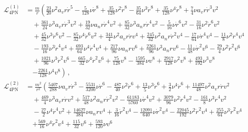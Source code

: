 \documentclass[prd,preprint,superscriptaddress,tightenlines,nofootinbib,
  eqsecnum,showpacs]{revtex4}
\begin{document}
\begin{subequations}
\begin{align}
\mathcal{L}^{(1)}_\text{4PN} &= \frac{m}{r} 
\left(\frac{23}{20} \nu^2 a_{v} r \dot{r}^5
 -  \frac{5}{128} \nu \dot{r}^8
 + \frac{35}{128} \nu^2 \dot{r}^8
 -  \frac{35}{64} \nu^3 \dot{r}^8
 + \frac{35}{128} \nu^4 \dot{r}^8
 + \frac{7}{4} \nu a_{v} r \dot{r}^3 v^{2}\right.\nonumber\\
& \quad + \frac{361}{24} \nu^3 a_{v} r \dot{r}^3 v^{2}
 + \frac{19}{32} \nu a_{n} r \dot{r}^4 v^{2}
 + \frac{85}{32} \nu^3 a_{n} r \dot{r}^4 v^{2}
 -  \frac{5}{16} \nu \dot{r}^6 v^{2}
 -  \frac{31}{16} \nu^2 \dot{r}^6 v^{2}\nonumber\\
&\quad + \frac{45}{32} \nu^3 \dot{r}^6 v^{2}
 -  \frac{85}{32} \nu^4 \dot{r}^6 v^{2}
 + \frac{341}{4} \nu^2 a_{v} r \dot{r} v^{4}
 + \frac{245}{32} \nu^2 a_{n} r \dot{r}^2 v^{4}
 -  \frac{17}{64} \nu \dot{r}^4 v^{4}
 -  \frac{11}{8} \nu^2 \dot{r}^4 v^{4}\nonumber\\
&\quad -  \frac{193}{16} \nu^3 \dot{r}^4 v^{4}
 + \frac{693}{64} \nu^4 \dot{r}^4 v^{4}
 + \frac{217}{96} \nu a_{n} r v^{6}
 + \frac{2261}{96} \nu^3 a_{n} r v^{6}
 -  \frac{11}{48} \nu \dot{r}^2 v^{6}
 -  \frac{29}{4} \nu^2 \dot{r}^2 v^{6}\nonumber\\
&\quad + \frac{1021}{96} \nu^3 \dot{r}^2 v^{6}
 -  \frac{665}{32} \nu^4 \dot{r}^2 v^{6}
 + \frac{75}{128} v^{8}
 -  \frac{1595}{384} \nu v^{8}
 + \frac{2917}{128} \nu^2 v^{8}
 + \frac{493}{192} \nu^3 v^{8}\nonumber\\
&\quad\left. -  \frac{2261}{128} \nu^4 v^{8}\right) \,,\\
\mathcal{L}^{(2)}_\text{4PN} &= \frac{m^2}{r^2} 
\left(\frac{5407}{288} \nu a_{v} r \dot{r}^3
 -  \frac{5531}{3200} \nu \dot{r}^6
 -  \frac{487}{40} \nu^2 \dot{r}^6
 + \frac{13}{5} \nu^3 \dot{r}^6
 + \frac{3}{2} \nu^4 \dot{r}^6
 + \frac{11497}{48} \nu^2 a_{v} r \dot{r} v^{2}\right.\nonumber\\
&\quad + \frac{469}{4} \nu^3 a_{v} r \dot{r} v^{2}
 + \frac{517}{48} \nu^2 a_{n} r \dot{r}^2 v^{2}
 -  \frac{61183}{5760} \nu \dot{r}^4 v^{2}
 + \frac{3079}{96} \nu^2 \dot{r}^4 v^{2}
 -  \frac{161}{8} \nu^3 \dot{r}^4 v^{2}\nonumber\\
&\quad -  \frac{27}{2} \nu^4 \dot{r}^4 v^{2}
 + \frac{14627}{384} \nu a_{n} r v^{4}
 + \frac{3}{16} \dot{r}^2 v^{4}
 -  \frac{12091}{640} \nu \dot{r}^2 v^{4}
 -  \frac{22045}{192} \nu^2 \dot{r}^2 v^{4}
 + \frac{255}{64} \nu^3 \dot{r}^2 v^{4}\nonumber\\
&\quad\left. + \frac{569}{16} \nu^4 \dot{r}^2 v^{4}
 + \frac{115}{32} v^{6}
 + \frac{593}{120} \nu v^{6}

\end{align}
\end{subequations}
\end{document}
